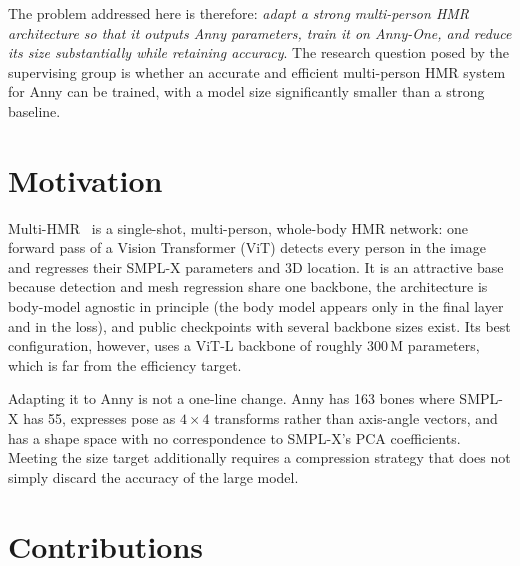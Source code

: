 The problem addressed here is therefore: \emph{adapt a strong multi-person HMR
architecture so that it outputs Anny parameters, train it on Anny-One, and
reduce its size substantially while retaining accuracy}. The research question
posed by the supervising group is whether an accurate and efficient multi-person
HMR system for Anny can be trained, with a model size significantly smaller than
a strong baseline.

\section{Motivation}

Multi-HMR~\cite{baradel2024multihmr} is a single-shot, multi-person, whole-body
HMR network: one forward pass of a Vision Transformer (ViT) detects every person
in the image and regresses their SMPL-X parameters and 3D location. It is an
attractive base because detection and mesh regression share one backbone, the
architecture is body-model agnostic in principle (the body model appears only
in the final layer and in the loss), and public checkpoints with several
backbone sizes exist. Its best configuration, however, uses a ViT-L backbone
of roughly 300\,M parameters, which is far from the efficiency target.

Adapting it to Anny is not a one-line change. Anny has 163 bones where SMPL-X
has 55, expresses pose as $4{\times}4$ transforms rather than axis-angle vectors,
and has a shape space with no correspondence to SMPL-X's PCA coefficients.
Meeting the size target additionally requires a compression strategy that does
not simply discard the accuracy of the large model.

\section{Contributions}

